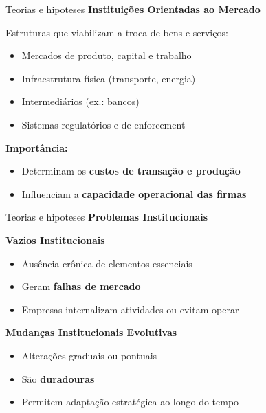 \documentclass[
  10pt,
  ignorenonframetext,
  aspectratio=169,
  brazilian,
]{beamer}
\providecommand{\tightlist}{%
  \setlength{\itemsep}{0pt}\setlength{\parskip}{0pt}}
\begin{document}
\begin{frame}{Teorias e hipoteses}
\label{teorias-e-hipoteses-1}
\textbf{Instituições Orientadas ao Mercado}

Estruturas que viabilizam a troca de bens e serviços:

\begin{itemize}
\tightlist
\item
  Mercados de produto, capital e trabalho
\item
  Infraestrutura física (transporte, energia)
\item
  Intermediários (ex.: bancos)
\item
  Sistemas regulatórios e de enforcement
\end{itemize}

\textbf{Importância:}

\begin{itemize}
\tightlist
\item
  Determinam os \textbf{custos de transação e produção}
\item
  Influenciam a \textbf{capacidade operacional das firmas}
\end{itemize}
\end{frame}

\begin{frame}{Teorias e hipoteses}
\label{teorias-e-hipoteses-2}
\textbf{Problemas Institucionais}

\textbf{Vazios Institucionais}

\begin{itemize}
\tightlist
\item
  Ausência crônica de elementos essenciais
\item
  Geram \textbf{falhas de mercado}
\item
  Empresas internalizam atividades ou evitam operar
\end{itemize}

\textbf{Mudanças Institucionais Evolutivas}

\begin{itemize}
\tightlist
\item
  Alterações graduais ou pontuais
\item
  São \textbf{duradouras}
\item
  Permitem adaptação estratégica ao longo do tempo
\end{itemize}
\end{frame}
\end{document}
